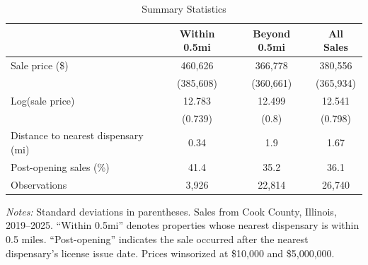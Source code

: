 \begin{table}[H]
\centering
\caption{Summary Statistics}
\label{tab:summary}
\begin{threeparttable}
\begin{tabular}{lSSS}
\toprule
 & {Within 0.5mi} & {Beyond 0.5mi} & {All Sales} \\
\midrule
Sale price (\$) & 460,626 & 366,778 & 380,556 \\
& (385,608) & (360,661) & (365,934) \\[4pt]
Log(sale price) & 12.783 & 12.499 & 12.541 \\
& (0.739) & (0.8) & (0.798) \\[4pt]
Distance to nearest dispensary (mi) & 0.34 & 1.9 & 1.67 \\[4pt]
Post-opening sales (\%) & 41.4 & 35.2 & 36.1 \\[4pt]
Observations & 3,926 & 22,814 & 26,740 \\
\bottomrule
\end{tabular}
\begin{tablenotes}[flushleft]
\small
\textit{Notes:} Standard deviations in parentheses. Sales from Cook County, Illinois, 2019--2025. ``Within 0.5mi'' denotes properties whose nearest dispensary is within 0.5 miles. ``Post-opening'' indicates the sale occurred after the nearest dispensary's license issue date. Prices winsorized at \$10,000 and \$5,000,000.
\end{tablenotes}
\end{threeparttable}
\end{table}

